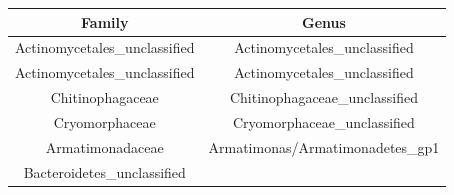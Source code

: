 \documentclass[]{article}
\begin{document}
\begin{longtable}[]{@{}cc@{}}
\toprule
\begin{minipage}[b]{0.46\columnwidth}\centering\strut
Family\strut
\end{minipage} & \begin{minipage}[b]{0.46\columnwidth}\centering\strut
Genus\strut
\end{minipage}\tabularnewline
\midrule
\endhead
\begin{minipage}[t]{0.46\columnwidth}\centering\strut
Actinomycetales\_unclassified\strut
\end{minipage} & \begin{minipage}[t]{0.46\columnwidth}\centering\strut
Actinomycetales\_unclassified\strut
\end{minipage}\tabularnewline
\begin{minipage}[t]{0.46\columnwidth}\centering\strut
Actinomycetales\_unclassified\strut
\end{minipage} & \begin{minipage}[t]{0.46\columnwidth}\centering\strut
Actinomycetales\_unclassified\strut
\end{minipage}\tabularnewline
\begin{minipage}[t]{0.46\columnwidth}\centering\strut
Chitinophagaceae\strut
\end{minipage} & \begin{minipage}[t]{0.46\columnwidth}\centering\strut
Chitinophagaceae\_unclassified\strut
\end{minipage}\tabularnewline
\begin{minipage}[t]{0.46\columnwidth}\centering\strut
Cryomorphaceae\strut
\end{minipage} & \begin{minipage}[t]{0.46\columnwidth}\centering\strut
Cryomorphaceae\_unclassified\strut
\end{minipage}\tabularnewline
\begin{minipage}[t]{0.46\columnwidth}\centering\strut
Armatimonadaceae\strut
\end{minipage} & \begin{minipage}[t]{0.46\columnwidth}\centering\strut
Armatimonas/Armatimonadetes\_gp1\strut
\end{minipage}\tabularnewline
\begin{minipage}[t]{0.46\columnwidth}\centering\strut
Bacteroidetes\_unclassified\strut
\end{minipage} & \begin{minipage}[t]{0.46\columnwidth}\centering\strut

\end{minipage}
\end{longtable}
\end{document}

